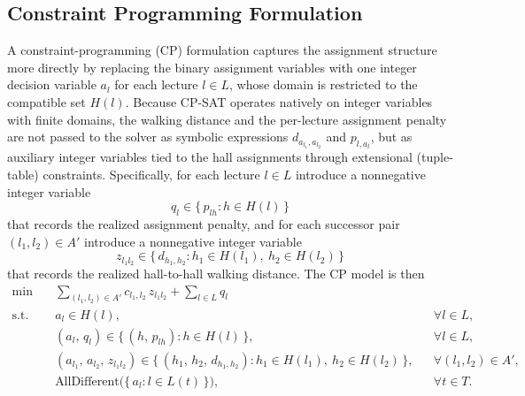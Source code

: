 \documentclass[11pt]{article}
\begin{document}
\subsection{Constraint Programming Formulation}
\label{subsec:cp-formulation}
A constraint-programming (CP) formulation captures the assignment structure more directly by replacing the binary assignment variables with one integer decision variable $a_l$ for each lecture $l \in L$, whose domain is restricted to the compatible set $H(l)$. Because CP-SAT operates natively on integer variables with finite domains, the walking distance and the per-lecture assignment penalty are not passed to the solver as symbolic expressions $d_{a_{l_1},a_{l_2}}$ and $p_{l, a_l}$, but as auxiliary integer variables tied to the hall assignments through extensional (tuple-table) constraints. Specifically, for each lecture $l \in L$ introduce a nonnegative integer variable
\[
q_l \in \bigl\{\, p_{lh} : h \in H(l) \,\bigr\}
\]
that records the realized assignment penalty, and for each successor pair $(l_1,l_2) \in A'$ introduce a nonnegative integer variable
\[
z_{l_1 l_2} \in \bigl\{\, d_{h_1,h_2} : h_1 \in H(l_1),\ h_2 \in H(l_2) \,\bigr\}
\]
that records the realized hall-to-hall walking distance. The CP model is then
\begin{align}
    \min \quad & \sum_{(l_1,l_2) \in A'} c_{l_1,l_2}\, z_{l_1 l_2}
    + \sum_{l \in L} q_l \label{eq:cpsat-obj} \\
    \text{s.t.} \quad
    & a_l \in H(l), && \forall l \in L, \label{eq:cpsat-domain} \\
    & (a_l,\, q_l) \in \bigl\{\, (h,\, p_{lh}) : h \in H(l) \,\bigr\}, && \forall l \in L, \label{eq:cpsat-q-table} \\
    & (a_{l_1},\, a_{l_2},\, z_{l_1 l_2}) \in \bigl\{\, (h_1,\, h_2,\, d_{h_1,h_2}) : h_1 \in H(l_1),\ h_2 \in H(l_2) \,\bigr\},
    && \forall (l_1,l_2) \in A', \label{eq:cpsat-z-table} \\
    & \text{AllDifferent}\bigl(\{\, a_l : l \in L(t) \,\}\bigr), && \forall t \in T. \label{eq:cpsat-alldiff}
\end{align}
\end{document}

